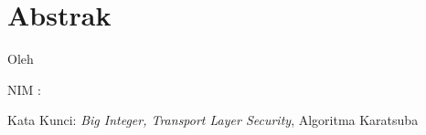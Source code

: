 \clearpage
\chapter*{Abstrak}

\begin{center}
  \large \bfseries \MakeUppercase{\thetitle}

  \normalsize \normalfont Oleh

  \theauthor

  NIM : \thestudentnumber
\end{center}


\begin{singlespacing}

\Blindtext

\end{singlespacing}


Kata Kunci: \textit{Big Integer, Transport Layer Security}, Algoritma Karatsuba
